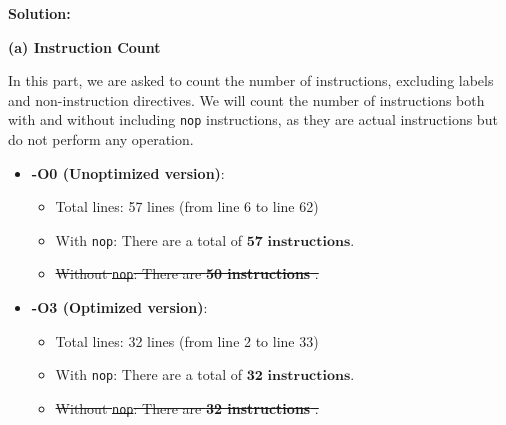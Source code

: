\textbf{Solution:}

\textbf{(a) Instruction Count}

In this part, we are asked to count the number of instructions, excluding labels and non-instruction directives. We will count the number of instructions both with and without including \texttt{nop} instructions, as they are actual instructions but do not perform any operation.

\begin{itemize}
    \item \textbf{-O0 (Unoptimized version)}:
    \begin{itemize}
        \item Total lines: 57 lines (from line 6 to line 62)
        \item With \texttt{nop}: There are a total of $\boxed{\textbf{57 instructions}}$.
        \item \sout{Without \texttt{nop}: There are \textbf{50 instructions} .}
    \end{itemize}
    
    \item \textbf{-O3 (Optimized version)}:
    \begin{itemize}
        \item Total lines: 32 lines (from line 2 to line 33)
        \item With \texttt{nop}: There are a total of $\boxed{\textbf{32 instructions}}$.
        \item \sout{Without \texttt{nop}: There are \textbf{32 instructions} .}
    \end{itemize}
\end{itemize}

